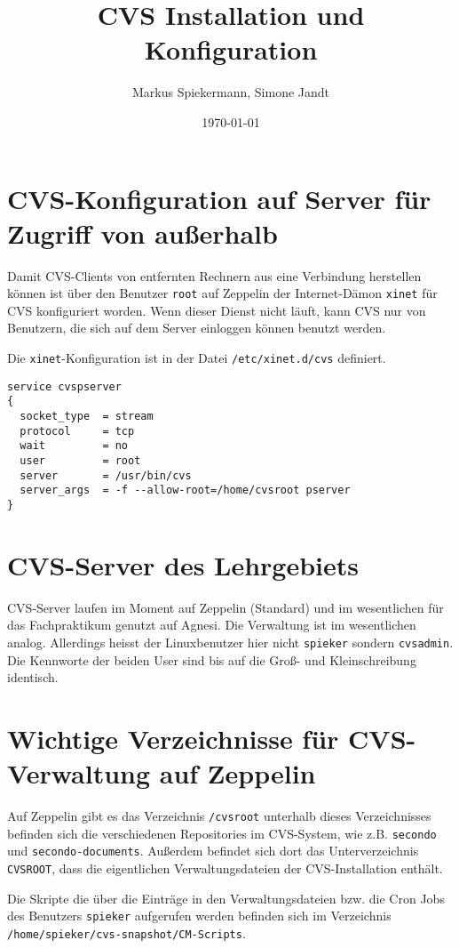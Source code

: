 \documentclass[a4paper, 10pt]{article}
\title{CVS Installation und Konfiguration}
\author{Markus Spiekermann, Simone Jandt}
\date{\today}
\newcommand{\file}[1]{\texttt{#1}}
\begin{document}
  \maketitle
\section{CVS-Konfiguration auf Server f\"ur Zugriff von au\ss{}erhalb}
Damit CVS-Clients von entfernten Rechnern aus eine Verbindung herstellen
k\"onnen ist \"uber den Benutzer \file{root} auf Zeppelin der Internet-D\"amon
\file{xinet} f\"ur CVS konfiguriert worden. Wenn dieser Dienst nicht l\"auft,
kann CVS nur von Benutzern, die sich auf dem Server einloggen k\"onnen
benutzt werden.

Die \file{xinet}-Konfiguration ist in der Datei \file{/etc/xinet.d/cvs} definiert.

\begin{verbatim}
service cvspserver
{
  socket_type  = stream
  protocol     = tcp
  wait         = no
  user         = root
  server       = /usr/bin/cvs
  server_args  = -f --allow-root=/home/cvsroot pserver
}
\end{verbatim}

\section{CVS-Server des Lehrgebiets}
CVS-Server laufen im Moment auf Zeppelin (Standard) und im wesentlichen f\"ur
das Fachpraktikum genutzt auf Agnesi. Die Verwaltung ist im wesentlichen analog.
Allerdings heisst der Linuxbenutzer hier nicht \file{spieker} sondern \file{cvsadmin}.
Die Kennworte der beiden User sind bis auf die Gro\ss{}- und Kleinschreibung identisch.

\section{Wichtige Verzeichnisse f\"ur CVS-Verwaltung auf Zeppelin}
Auf Zeppelin gibt es das Verzeichnis \file{/cvsroot}
unterhalb dieses Verzeichnisses befinden sich die verschiedenen Repositories im
CVS-System, wie z.B. \file{secondo} und \file{secondo-documents}. Au\ss{}erdem
befindet sich dort das Unterverzeichnis \file{CVSROOT}, dass die eigentlichen
Verwaltungsdateien der CVS-Installation enth\"alt.

Die Skripte die \"uber die Eintr\"age in den Verwaltungsdateien bzw. die
Cron Jobs des Benutzers \file{spieker} aufgerufen werden befinden sich im
Verzeichnis \file{/home/spieker/cvs-snapshot/CM-Scripts}.
\end{document}
